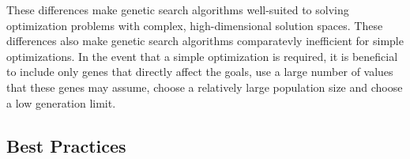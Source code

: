 These differences make genetic search algorithms well-suited to solving optimization problems with complex, high-dimensional solution spaces.  These differences also make genetic search algorithms comparatevly inefficient for simple optimizations.  In the event that a simple optimization is required, it is beneficial to include only genes that directly affect the goals, use a large number of values that these genes may assume, choose a relatively large population size and choose a low generation limit.

\subsection{Best Practices} \label{ssec:bestPractices}

